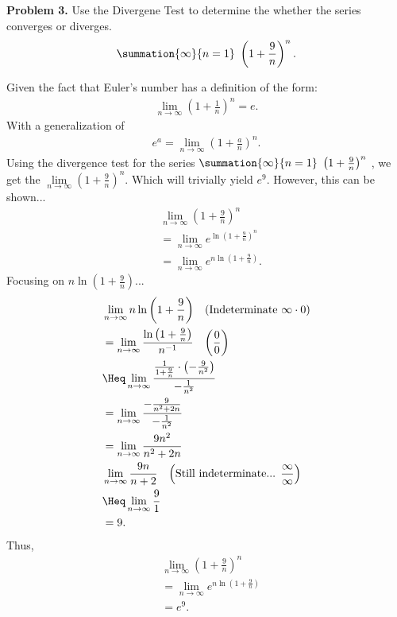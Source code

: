 \documentclass{report}
\begin{document}
    \pagebreak \bigbreak \noindent 
    \begin{mdframed}
        \textbf{Problem 3.} Use the Divergene Test to determine the whether the series converges or diverges. 
        \begin{align*}
            \summation{\infty}{n=1}\ \left(1+\frac{9}{n}\right)^{n} 
        .\end{align*}
    \end{mdframed}
    \bigbreak \noindent 
    Given the fact that Euler's number has a definition of the form:
    \begin{align*}
        \lim\limits_{n \to \infty}{\left(1+\frac{1}{n}\right)^{n}} = e
    .\end{align*}
    \bigbreak \noindent 
   With a  generalization of 
   \begin{align*}
       e^{a} = \lim\limits_{n \to \infty}{\left(1+\frac{a}{n}\right)^{n}}
   .\end{align*}
   \bigbreak \noindent 
   Using the divergence test for the series $\summation{\infty}{n=1}\ \left(1+\frac{9}{n}\right)^{n}\ $, we get the $\lim\limits_{n \to \infty}{\left(1+\frac{9}{n}\right)^{n}} $. Which will trivially  yield $e^{9}$. However, this can be shown...
   \begin{align*}
       &\lim\limits_{n \to \infty}{\left(1+\frac{9}{n}\right)^{n}} \\
       &=\lim\limits_{n \to \infty}{e^{\ln{\left(1+\frac{9}{n}\right)^{n}}}} \\
       &=\lim\limits_{n \to \infty}{e^{n\ln{\left(1+\frac{9}{n}\right)}}} 
   .\end{align*}
   \bigbreak \noindent 
   Focusing on $n\ln{\left(1+\frac{9}{n}\right)} $...
   \begin{align*}
       &\lim\limits_{n \to \infty}{n\ln{\left(1+\frac{9}{n}\right)}} \quad \text{(Indeterminate $\infty\cdot 0$)} \\
       &=\lim\limits_{n \to \infty}{\frac{\ln{\left(1+\frac{9}{n}\right)}}{n^{-1}}} \quad \text{$\left(\frac{0}{0}\right)$} \\
       & \Heq\lim\limits_{n \to \infty}{\frac{\frac{1}{1+\frac{9}{n}}\cdot \left(-\frac{9}{n^{2}}\right)}{-\frac{1}{n^{2}}}} \\
       &=\lim\limits_{n \to \infty}{\frac{-\frac{9}{n^{2}+2n}}{-\frac{1}{n^{2}}}} \\
       &=\lim\limits_{n \to \infty}{\frac{9n^{2}}{n^{2}+2n}} \\
       &\lim\limits_{n \to \infty}{\frac{9n}{n+2}} \quad \text{$\left(\text{Still indeterminate... } \frac{\infty}{\infty}\right)$} \\
       &\Heq\lim\limits_{n \to \infty}{\frac{9}{1}} \\ 
       &=9
   .\end{align*}
   \bigbreak \noindent 
   Thus,
   \begin{align*}
       &\lim\limits_{n \to \infty}{\left(1+\frac{9}{n}\right)^{n}} \\
       &=\lim\limits_{n \to \infty}{e^{n\ln{\left(1+\frac{9}{n}\right)}}} \\
       &=e^{9}
   .\end{align*}
\end{document}
